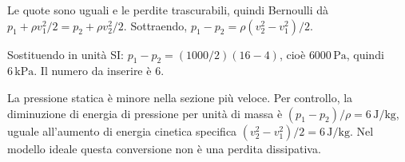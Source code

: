 \documentclass[11pt,a4paper]{article}
\begin{document}
\begin{samepage}
Le quote sono uguali e le perdite trascurabili, quindi Bernoulli dà \(p_1+\rho v_1^2/2=p_2+\rho v_2^2/2\). Sottraendo, \(p_1-p_2=\rho(v_2^2-v_1^2)/2\).\par

Sostituendo in unità SI: \(p_1-p_2=(1000/2)(16-4)\), cioè \(6000\,\mathrm{Pa}\), quindi \(6\,\mathrm{kPa}\). Il numero da inserire è \(6\).\par

La pressione statica è minore nella sezione più veloce. Per controllo, la diminuzione di energia di pressione per unità di massa è \((p_1-p_2)/\rho=6\,\mathrm{J/kg}\), uguale all’aumento di energia cinetica specifica \((v_2^2-v_1^2)/2=6\,\mathrm{J/kg}\). Nel modello ideale questa conversione non è una perdita dissipativa.\par

\end{samepage}
\newpage
\end{document}
